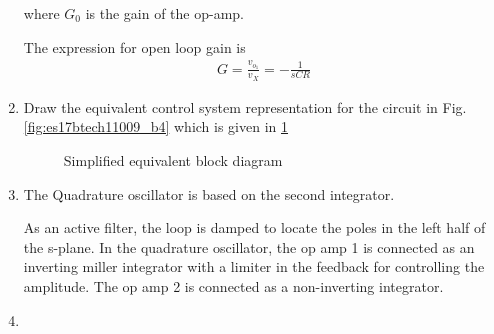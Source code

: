 \begin{enumerate}[label=\arabic*.,ref=\theenumi]
where $G_{0}$ is the gain of the op-amp.

The expression for open loop gain is 
\begin{align}
    G = \frac{v_{o_1}}{v_{X}} = -\frac{1}{sCR}
    \label{eq:es17btech11009_G}
\end{align}

\item
Draw the equivalent control system representation for the circuit in Fig. \ref{fig:es17btech11009_b4} which is given in \ref{fig:es17btech11009_block}

\renewcommand{\thefigure}{\theenumi.\arabic{figure}}
\begin{figure}[!ht]
	\begin{center}
		\resizebox{\columnwidth}{!}{}
	\end{center}
\caption{Simplified equivalent block diagram}
\label{fig:es17btech11009_block}
\end{figure}
\item 
 The Quadrature oscillator is based on the second integrator.

As an active filter, the loop is damped to locate the poles in the left half of the s-plane. In the quadrature oscillator, the op amp 1 is connected as an inverting miller integrator with a limiter in the feedback for controlling the amplitude. The op amp 2 is connected as a non-inverting integrator.

\item


\end{enumerate}
